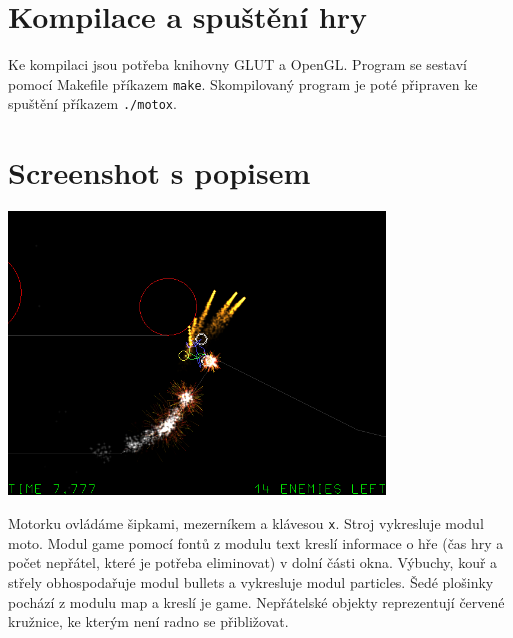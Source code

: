 \documentclass{article}
\begin{document}
\section{Kompilace a spuštění hry}

Ke kompilaci jsou potřeba knihovny GLUT a OpenGL. Program se sestaví pomocí
Makefile příkazem \texttt{make}. Skompilovaný program je poté připraven ke
spuštění příkazem \texttt{./motox}.

\section{Screenshot s popisem}
\begin{center}
\includegraphics[width=10cm]{combat.png}
\end{center}

Motorku ovládáme šipkami, mezerníkem a klávesou \texttt{x}. Stroj vykresluje modul moto. Modul game pomocí fontů z modulu text kreslí informace o hře (čas hry a počet nepřátel, které je potřeba eliminovat) v dolní části okna. Výbuchy, kouř a střely obhospodařuje modul bullets a vykresluje modul particles. Šedé plošinky pochází z modulu map a kreslí je game. Nepřátelské objekty reprezentují červené kružnice, ke kterým není radno se přibližovat.
\end{document}
